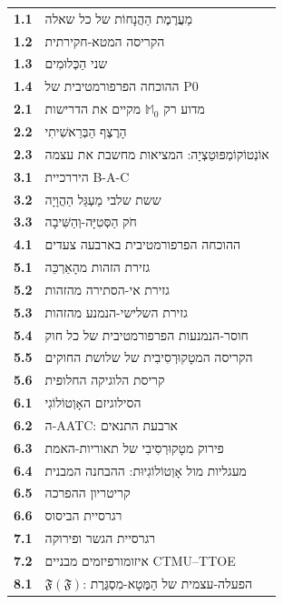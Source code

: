 \documentclass[10pt, openany, oneside]{book}
\renewcommand{\footnotesize}{\fontsize{8.5}{11}\selectfont}
\begin{document}
\vspace{1em}

{\footnotesize
\noindent\begin{tabular}{r p{}}
\textbf{1.1} & מַעֲרֶמֶת הַהֲנָחוֹת של כל שאלה \\[0.2em]
\textbf{1.2} & הקריסה המטא-חקירתית \\[0.2em]
\textbf{1.3} & שני הַכְּלוּמִים \\[0.2em]
\textbf{1.4} & ההוכחה הפרפורמטיבית של P0 \\[0.2em]
\textbf{2.1} & מדוע רק $\mathbb{M}_0$ מקיים את הדרישות \\[0.2em]
\textbf{2.2} & הָרֶצֶף הַבְּרֵאשִׁיתִי \\[0.2em]
\textbf{2.3} & אוֹנְטוֹקוֹמְפּוּטַצְיָה: המציאות מחשבת את עצמה \\[0.2em]
\textbf{3.1} & היררכיית B-A-C \\[0.2em]
\textbf{3.2} & ששת שלבי מַעְגַּל הַהֲוָיָה \\[0.2em]
\textbf{3.3} & חֹק הַסְּטִיָּה-וְהַשִּׁיבָה \\[0.2em]
\textbf{4.1} & ההוכחה הפרפורמטיבית בארבעה צעדים \\[0.2em]
\textbf{5.1} & גזירת הזהות מהָאַרְכֵּה \\[0.2em]
\textbf{5.2} & גזירת אי-הסתירה מהזהות \\[0.2em]
\textbf{5.3} & גזירת השלישי-הנמנע מהזהות \\[0.2em]
\textbf{5.4} & חוסר-הנמנעות הפרפורמטיבית של כל חוק \\[0.2em]
\textbf{5.5} & הקריסה המטָקוּרְסִיבִית של שלושת החוקים \\[0.2em]
\textbf{5.6} & קריסת הלוגיקה החלופית \\[0.2em]
\textbf{6.1} & הסילוגיזם האָוְטוֹלוֹגִי \\[0.2em]
\textbf{6.2} & ה-AATC: ארבעת התנאים \\[0.2em]
\textbf{6.3} & פירוק מטָקוּרְסִיבִי של תאוריות-האמת \\[0.2em]
\textbf{6.4} & מעגליות מול אָוְטוֹלוֹגִיוּת: ההבחנה המבנית \\[0.2em]
\textbf{6.5} & קריטריון ההפרכה \\[0.2em]
\textbf{6.6} & רגרסיית הביסוס \\[0.2em]
\textbf{7.1} & רגרסיית הגשר ופירוקה \\[0.2em]
\textbf{7.2} & איזומורפיזמים מבניים CTMU--TTOE \\[0.2em]
\textbf{8.1} & $\mathfrak{F}(\mathfrak{F})$: הפעלה-עצמית של הַמֶּטָא-מִסְגֶּרֶת \\[0.2em]

\end{tabular}}
\end{document}
